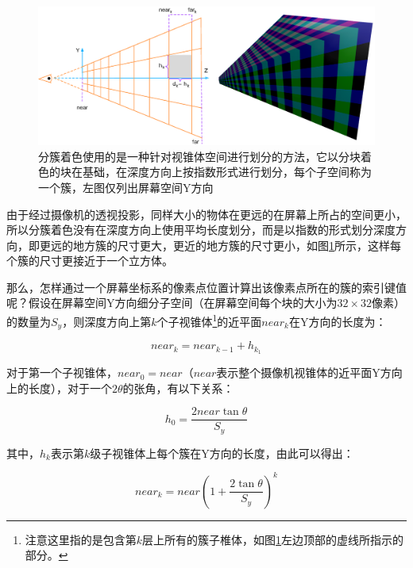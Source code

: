 \begin{figure}
\begin{fullwidth}
	\includegraphics[width=\thewidth]{figures/shade/clusters}
	\caption{分簇着色使用的是一种针对视锥体空间进行划分的方法，它以分块着色的块在基础，在深度方向上按指数形式进行划分，每个子空间称为一个簇，左图仅列出屏幕空间Y方向}
	\label{f:shade-clusters}
\end{fullwidth}
\end{figure}

由于经过摄像机的透视投影，同样大小的物体在更远的在屏幕上所占的空间更小，所以分簇着色没有在深度方向上使用平均长度划分，而是以指数的形式划分深度方向，即更远的地方簇的尺寸更大，更近的地方簇的尺寸更小，如图\ref{f:shade-clusters}所示，这样每个簇的尺寸更接近于一个立方体。

那么，怎样通过一个屏幕坐标系的像素点位置计算出该像素点所在的簇的索引键值呢？假设在屏幕空间Y方向细分子空间（在屏幕空间每个块的大小为$32\times 32$像素）的数量为$S_y$，则深度方向上第$k$个子视锥体\footnote{注意这里指的是包含第$k$层上所有的簇子椎体，如图\ref{f:shade-clusters}左边顶部的虚线所指示的部分。}的近平面$near_k$在Y方向的长度为：

\begin{equation}
	near_k=near_{k-1}+h_{k_1}
\end{equation}

\noindent 对于第一个子视锥体，$near_0=near$（$near$表示整个摄像机视锥体的近平面Y方向上的长度），对于一个$2\theta$的张角，有以下关系：

\begin{equation}
	h_0=\frac{2near\tan{\theta}}{S_y}
\end{equation}

\noindent 其中，$h_k$表示第$k$级子视锥体上每个簇在Y方向的长度，由此可以得出：

\begin{equation}
	near_k=near(1+\frac{2\tan{\theta}}{S_y})^k
\end{equation}

